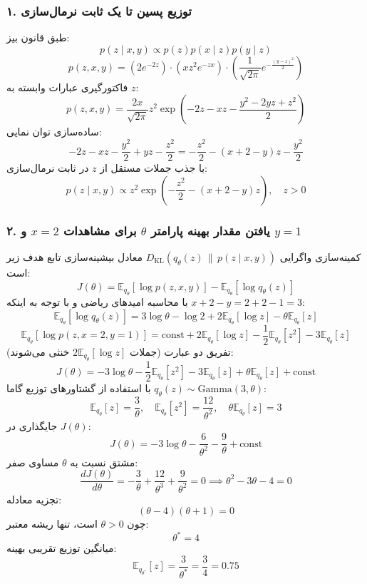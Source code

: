 \subsubsection{۱. توزیع پسین تا یک ثابت نرمال‌سازی}
طبق قانون بیز:
\[
  p(z \mid x, y) \propto p(z) p(x \mid z) p(y \mid z)
\]
\[
  p(z, x, y) = (2 e^{-2z}) \cdot (x z^2 e^{-z x}) \cdot \left( \frac{1}{\sqrt{2\pi}} e^{-\frac{(y-z)^2}{2}} \right)
\]
فاکتورگیری عبارات وابسته به $z$:
\[
  p(z, x, y) = \frac{2x}{\sqrt{2\pi}} z^2 \exp\left( -2z - x z - \frac{y^2 - 2yz + z^2}{2} \right)
\]
ساده‌سازی توان نمایی:
\[
  -2z - x z - \frac{y^2}{2} + y z - \frac{z^2}{2} = -\frac{z^2}{2} - (x + 2 - y) z - \frac{y^2}{2}
\]
با جذب جملات مستقل از $z$ در ثابت نرمال‌سازی:
\begin{equation}
  p(z \mid x, y) \propto z^2 \exp\left( -\frac{z^2}{2} - (x + 2 - y) z \right), \quad z > 0
  \label{eq:q1-posterior}
\end{equation}

\subsubsection{۲. یافتن مقدار بهینه پارامتر $\theta$ برای مشاهدات $x = 2$ و $y = 1$}
کمینه‌سازی واگرایی $D_{\text{KL}}(q_\theta(z) \,\|\, p(z \mid x, y))$ معادل بیشینه‌سازی تابع هدف زیر است:
\[
  J(\theta) = \mathbb{E}_{q_\theta}[\log p(z, x, y)] - \mathbb{E}_{q_\theta}[\log q_\theta(z)]
\]
با محاسبه امیدهای ریاضی و با توجه به اینکه $x + 2 - y = 2 + 2 - 1 = 3$:
\[
  \mathbb{E}_{q_\theta}[\log q_\theta(z)] = 3\log\theta - \log 2 + 2 \mathbb{E}_{q_\theta}[\log z] - \theta \mathbb{E}_{q_\theta}[z]
\]
\[
  \mathbb{E}_{q_\theta}[\log p(z, x=2, y=1)] = \text{const} + 2 \mathbb{E}_{q_\theta}[\log z] - \frac{1}{2} \mathbb{E}_{q_\theta}[z^2] - 3 \mathbb{E}_{q_\theta}[z]
\]
تفریق دو عبارت (جملات $2\mathbb{E}_{q_\theta}[\log z]$ خنثی می‌شوند):
\[
  J(\theta) = -3\log\theta - \frac{1}{2} \mathbb{E}_{q_\theta}[z^2] - 3 \mathbb{E}_{q_\theta}[z] + \theta \mathbb{E}_{q_\theta}[z] + \text{const}
\]
با استفاده از گشتاورهای توزیع گاما $q_\theta(z) \sim \mathrm{Gamma}(3, \theta)$:
\[
  \mathbb{E}_{q_\theta}[z] = \frac{3}{\theta}, \quad \mathbb{E}_{q_\theta}[z^2] = \frac{12}{\theta^2}, \quad \theta \mathbb{E}_{q_\theta}[z] = 3
\]
جایگذاری در $J(\theta)$:
\[
  J(\theta) = -3\log\theta - \frac{6}{\theta^2} - \frac{9}{\theta} + \text{const}
\]
مشتق نسبت به $\theta$ مساوی صفر:
\[
  \frac{d J(\theta)}{d\theta} = -\frac{3}{\theta} + \frac{12}{\theta^3} + \frac{9}{\theta^2} = 0 \implies \theta^2 - 3\theta - 4 = 0
\]
تجزیه معادله:
\[
  (\theta - 4)(\theta + 1) = 0
\]
چون $\theta > 0$ است، تنها ریشه معتبر:
\begin{equation}
  \theta^* = 4
\end{equation}
میانگین توزیع تقریبی بهینه:
\[
  \mathbb{E}_{q_{\theta^*}}[z] = \frac{3}{\theta^*} = \frac{3}{4} = 0.75
\]

